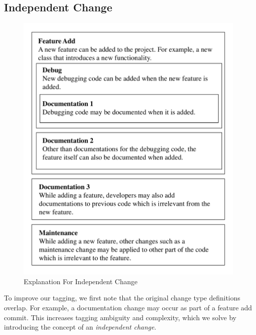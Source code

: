 \subsection{Independent Change}

\begin{figure}[htbp]
\centerline{\includegraphics[scale=0.5]{figures/independent_change.pdf}}
\caption{Explanation For Independent Change}
\label{fig:Relationship}
\end{figure}

To improve our tagging, we first note that the original change type definitions overlap. For example, a documentation change may occur as part of a feature add commit. This increases tagging ambiguity and complexity, which we solve by introducing the concept of an \textit{independent change}.

